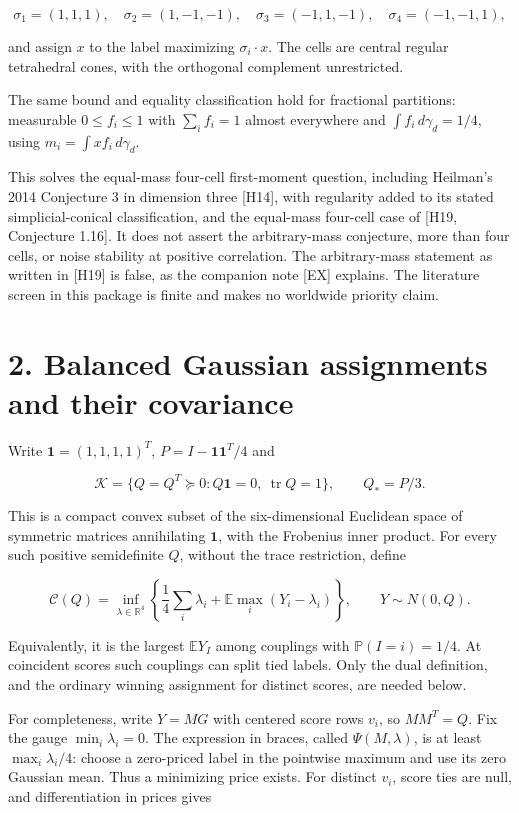\documentclass[
  11pt,
]{article}
\begin{document}
\[
 \sigma_1=(1,1,1),\quad \sigma_2=(1,-1,-1),\quad
 \sigma_3=(-1,1,-1),\quad \sigma_4=(-1,-1,1),
\]

and assign \(x\) to the label maximizing \(\sigma_i\cdot x\). The cells
are central regular tetrahedral cones, with the orthogonal complement
unrestricted.

The same bound and equality classification hold for fractional
partitions: measurable \(0\le f_i\le1\) with \(\sum_i f_i=1\) almost
everywhere and \(\int f_i\,d\gamma_d=1/4\), using
\(m_i=\int xf_i\,d\gamma_d\).

This solves the equal-mass four-cell first-moment question, including
Heilman's 2014 Conjecture 3 in dimension three {[}H14{]}, with
regularity added to its stated simplicial-conical classification, and
the equal-mass four-cell case of {[}H19, Conjecture 1.16{]}. It does not
assert the arbitrary-mass conjecture, more than four cells, or noise
stability at positive correlation. The arbitrary-mass statement as
written in {[}H19{]} is false, as the companion note {[}EX{]} explains.
The literature screen in this package is finite and makes no worldwide
priority claim.

\section{2. Balanced Gaussian assignments and their
covariance}\label{balanced-gaussian-assignments-and-their-covariance}

Write \(\mathbf1=(1,1,1,1)^T\), \(P=I-\mathbf1\mathbf1^T/4\) and

\[
 \mathcal K=\{Q=Q^T\succeq0:Q\mathbf1=0,\ \operatorname{tr}Q=1\},
 \qquad Q_*=P/3.
\]

This is a compact convex subset of the six-dimensional Euclidean space
of symmetric matrices annihilating \(\mathbf1\), with the Frobenius
inner product. For every such positive semidefinite \(Q\), without the
trace restriction, define

\[
 \mathcal C(Q)=\inf_{\lambda\in\mathbb R^4}
 \left\{\frac14\sum_i\lambda_i+
               \mathbb E\max_i(Y_i-\lambda_i)\right\},
 \qquad Y\sim N(0,Q).                                  \tag{2}
\]

Equivalently, it is the largest \(\mathbb E Y_I\) among couplings with
\(\mathbb P(I=i)=1/4\). At coincident scores such couplings can split
tied labels. Only the dual definition, and the ordinary winning
assignment for distinct scores, are needed below.

For completeness, write \(Y=MG\) with centered score rows \(v_i\), so
\(MM^T=Q\). Fix the gauge \(\min_i\lambda_i=0\). The expression in
braces, called \(\Psi(M,\lambda)\), is at least \(\max_i\lambda_i/4\):
choose a zero-priced label in the pointwise maximum and use its zero
Gaussian mean. Thus a minimizing price exists. For distinct \(v_i\),
score ties are null, and differentiation in prices gives
\end{document}
